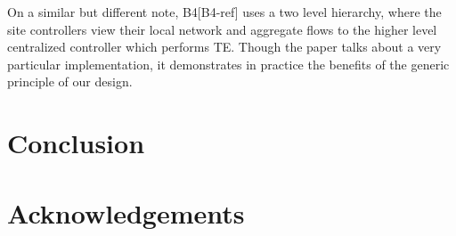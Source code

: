 \documentclass[10pt, twocolumn]{article}
\begin{document}
On a similar but different note, B4[B4-ref] uses a two level hierarchy, where the site controllers view their local network and aggregate flows to the higher level centralized controller which performs TE. Though the paper talks about a very particular implementation, it demonstrates in practice the benefits of the generic principle of our design.
\section{Conclusion}
\label{sec:conc}

\section{Acknowledgements}
\label{sec:ack}



\end{document}
